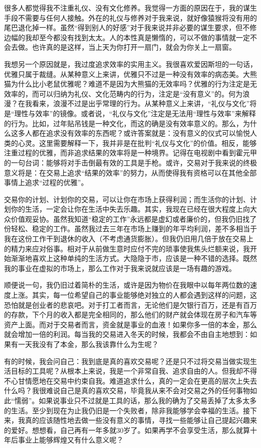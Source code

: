 很多人都觉得我不注重礼仪、没有文化修养。我觉得一方面的原因在于，我的谋生手段不需要与任何人接触。外在的礼仪与修养对于我来说，就好像猿猴将没有用的尾巴退化掉一样。虽然“得到别人的好感”对于我来说并非必要的谋生要求，但不修边幅的我却至今都没有找到太太。人的本性真是懒惰的，可以不做的事情就一定不会去做。也许真的是这样，当上天为你打开一扇门，就会为你关上一扇窗。

我想另一个原因就是，我过度追求效率的实用主义。我很喜欢爱因斯坦的一句话，优雅只属于裁缝。从某种意义上来讲，优雅只不过是一种没有效率的病态美。大熊猫为什么比小老鼠优雅呢？难道不是因为大熊猫的无效率吗？优雅的行为注定是无效率的，而可以归纳为礼仪、文化范畴内的行为，注定是“没有意义”的。何为浪漫？在我看来，浪漫不过是出乎常理的行为。从某种意义上来讲，“礼仪与文化”将是“理性与效率”的镜像。或者说，“礼仪与文化”注定是无法用“理性与效率”来解释的行为。比如，过年贴吊钱是一种文化，而这的确是没有效率意义的。那么，为什么这多人都在追求没有效率的东西呢？或许答案就是：没有意义的仪式可以愉悦人类的心灵。这里需要解释一下，我并非是在批判“礼仪与文化”的价值。相反，能够注重过程的优雅，而非追求结果的效率将是一种境界。记得在电视剧中看到霍元甲的一句台词：能够将对手击倒最有效的工具是手枪。或许，交易对于我来说的终极意义将是：在交易上追求“结果的效率”的努力，从而使得我有资格可以在其他全部事情上追求“过程的优雅”。

交易你的计划、计划你的交易，可以让你在市场上获得利润；而生活你的计划、计划你的生活，一定会让你在生活中失去乐趣。其实，我现在已经在很大程度上向大众价值观妥协。虽然我知道“稳定的工作”永远都是虚幻或者廉价的，但我仍旧找了份轻松、稳定的工作。虽然我过去三年在市场上赚到的年平均利润，差不多相当于我在这份工作干到退休的收入（不考虑通货膨胀）。但我仍旧用几倍于放在交易上的精力来应对俗事。相对于从前做生意时应付不完的琐事使我焦头烂额来说，我开始渐渐地喜欢上这种单纯的生活方式。大隐隐于市，应该是一种不错的选择。既然我的事业在虚拟的市场上，那么工作对于我来说就应该是一场有趣的游戏。

顺便说一句，我仍旧过着简朴的生活，或许是因为物价在我眼中以每年两位数的速度上涨。其实，每一位希望自己的事业能够绝对独立的人都会遇到这样的问题，这恐怕就是创业者的悲哀吧。对于打工者而言，无论他们是欠银行百万，还是有百万的存款，下个月的收入都是完全相同的，那么他们的财产就会体现在房子和汽车等资产上面。而对于交易者而言，资金就是事业的血液！如果你多一倍的本金，那么就会增加一倍的利润。每当我的交易进入冬天的时候，我都会不由自主地想到：如果有一天我没有了本金，那么我该靠什么为生呢？

有的时候，我会问自己：我到底是真的喜欢交易呢？还是只不过将交易当做实现生活目标的工具呢？从根本上来说，我是一个非常自我、追求自由的人。但我却不得不心甘情愿地在交易中约束自我。难道追求什么，真的一定会在更高的层次上失去什么吗？我很难说自己是真的喜欢交易，毕竟我从来不会对交易之外的任何事物如此“懦弱”。如果说事业只不过就是工具的话，那么我的确为了交易丢掉了太多太多的生活。至少到现在为止我仍旧是一个失败者，除非我能够学会幸福的生活。接下来，我真的应该随性地去做一些没有意义的事情，寻找一些能够让自己提起兴趣来的爱好。想想看，自己再有一年多就30岁了。如果再学不会享受生活，那么就算十年后事业上能够辉煌又有什么意义呢？


